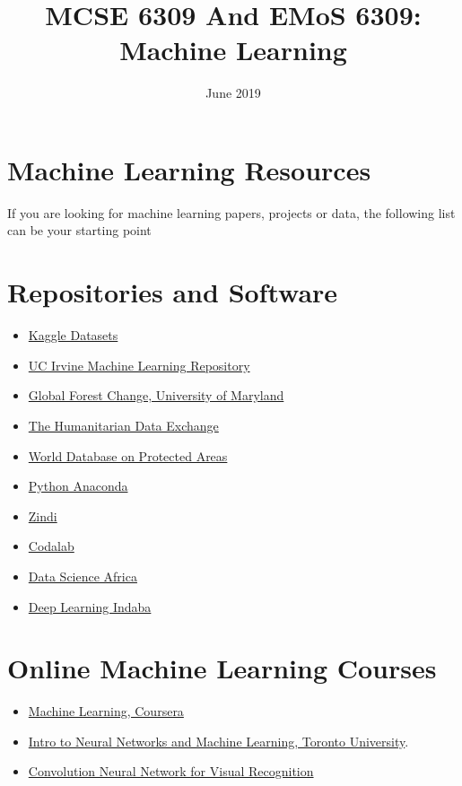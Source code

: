 \documentclass[a4, 10pt]{article}
\title{\textbf{MCSE 6309 And EMoS 6309:\\ Machine Learning  }}
\date{June 2019}
\begin{document}
\maketitle

\section*{Machine Learning Resources}
If you are looking for machine learning papers, projects or data, the following list can
be your starting point

\section*{Repositories and Software}
\begin{itemize}
	\item \href{https://www.kaggle.com/datasets}{Kaggle Datasets}
	\item \href{https://archive.ics.uci.edu/ml/index.php}{UC Irvine Machine Learning Repository}
	\item \href{https://earthenginepartners.appspot.com/science-2013-global-forest/download_v1.2.html}{Global Forest Change, University of Maryland}
	\item \href{https://data.humdata.org/dataset}{The Humanitarian Data Exchange}
	\item \href{https://www.protectedplanet.net/}{World Database on Protected Areas}
	\item \href{https://www.anaconda.com/download}{Python Anaconda}
	\item \href{http://zindi.africa/competitions}{Zindi}
	\item \href{https://competitions.codalab.org/competitions/}{Codalab}
	\item \href{http://datascienceafrica.org/}{Data Science Africa}
	\item \href{http://www.deeplearningindaba.com/}{Deep Learning Indaba}
\end{itemize}

\section*{Online Machine Learning Courses}
\begin{itemize}
	\item \href{https://www.coursera.org/learn/machine-learning}{Machine Learning, Coursera} 
	\item \href{http://www.cs.toronto.edu/~rgrosse/courses/csc321_2018/}{Intro to Neural Networks and Machine Learning, Toronto University}.
	\item \href{http://cs231n.stanford.edu/}{Convolution Neural Network for Visual Recognition}
\end{itemize}
\end{document}

